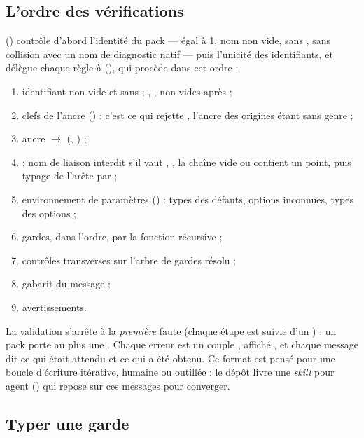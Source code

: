 \subsection{L'ordre des vérifications}

 () contrôle d'abord l'identité du pack ---  égal à 1, nom non vide, sans \code{/}, sans collision avec un nom de diagnostic natif --- puis l'unicité des identifiants, et délègue chaque règle à  (), qui procède dans cet ordre :
\begin{enumerate}
  \item identifiant non vide et sans \code{/} ; , ,  non vides après  ;
  \item clefs de l'ancre () : c'est ce qui rejette , l'ancre des origines étant sans genre ;
  \item ancre $\to$ (, ) ;
  \item {} : nom de liaison interdit s'il vaut , , la chaîne vide ou contient un point, puis typage de l'arête par  ;
  \item environnement de paramètres () : types des défauts, options inconnues, types des options ;
  \item gardes, dans l'ordre, par la fonction récursive  ;
  \item contrôles transverses sur l'arbre de gardes résolu ;
  \item gabarit du message ;
  \item avertissements.
\end{enumerate}

La validation s'arrête à la \emph{première} faute (chaque étape est suivie d'un ) : un pack porte au plus une . Chaque erreur est un couple , affiché \og {}\fg{}, et chaque message dit ce qui était attendu et ce qui a été obtenu. Ce format est pensé pour une boucle d'écriture itérative, humaine ou outillée : le dépôt livre une \emph{skill} pour agent () qui repose sur ces messages pour converger.

\subsection{Typer une garde}

